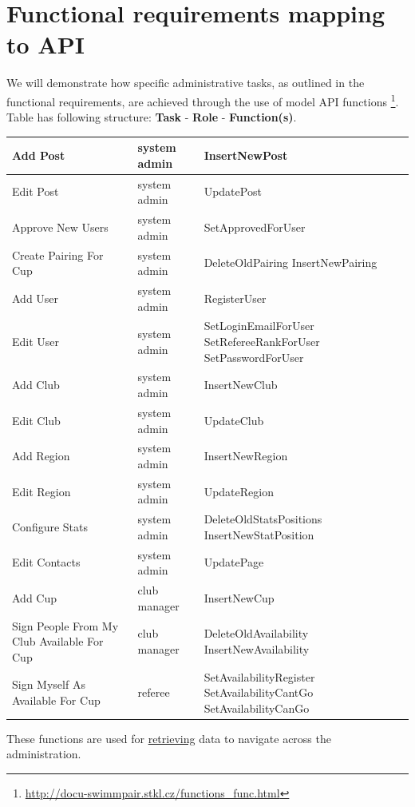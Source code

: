 \section {Functional requirements mapping to API}
We will demonstrate how specific administrative tasks, as outlined in the functional requirements, are achieved through the use of model API functions \footnote{\url{http://docu-swimmpair.stkl.cz/functions_func.html}}.
\newline
Table has following structure: \textbf{Task} - \textbf{Role} - \textbf{Function(s)}.
\newline
\begin{tabularx}{1.0\textwidth} { 
  | >{\raggedright\arraybackslash}X 
  | >{\centering\arraybackslash}X 
  | >{\raggedright\arraybackslash}X | }
 \hline
 Add Post & system admin& InsertNewPost \\
 \hline
 Edit Post  & system admin  & UpdatePost \\
 \hline
 Approve New Users & system admin & SetApprovedForUser \\
 \hline
 Create Pairing For Cup & system admin & DeleteOldPairing
InsertNewPairing\\
 \hline
 Add User & system admin & RegisterUser \\
 \hline
 Edit User & system admin &
 SetLoginEmailForUser
 SetRefereeRankForUser
 SetPasswordForUser\\
 \hline
 Add Club & system admin & InsertNewClub \\
 \hline
 Edit Club & system admin & UpdateClub \\
 \hline
 Add Region & system admin & InsertNewRegion \\
 \hline
 Edit Region & system admin & UpdateRegion \\
 \hline
 Configure Stats & system admin & DeleteOldStatsPositions
 InsertNewStatPosition \\
 \hline
 Edit Contacts & system admin & UpdatePage \\
 \hline
 Add Cup & club manager & InsertNewCup \\
 \hline
 Sign People From My Club Available For Cup & club manager & DeleteOldAvailability
 InsertNewAvailability \\
 \hline
 Sign Myself As Available For Cup & referee & SetAvailabilityRegister
 SetAvailabilityCantGo 
 SetAvailabilityCanGo \\
\hline
\end{tabularx}
\iffalse
These functions are used for \underline{retrieving} data to navigate across the administration.
